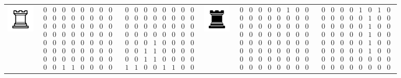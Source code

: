 \begin{table}[]
\begin{tabular}{c c c | c c c}
\includegraphics[scale=0.5]{fig/pieces/R} & 
$\begin{smallmatrix}0&0&0&0&0&0&0&0\\0&0&0&0&0&0&0&0\\0&0&0&0&0&0&0&0\\0&0&0&0&0&0&0&0\\0&0&0&0&0&0&0&0\\0&0&0&0&0&0&0&0\\0&0&0&0&0&0&0&0\\0&0&1&1&0&0&0&0\end{smallmatrix}$ &
$\begin{smallmatrix}0&0&0&0&0&0&0&0\\0&0&0&0&0&0&0&0\\0&0&0&0&0&0&0&0\\0&0&0&0&0&0&0&0\\0&0&0&1&0&0&0&0\\0&0&1&1&0&0&0&0\\0&0&1&1&0&0&0&0\\1&1&0&0&1&1&0&0\end{smallmatrix}$ &

\includegraphics[scale=0.5]{fig/pieces/r} &
$\begin{smallmatrix}0&0&0&0&0&1&0&0\\0&0&0&0&0&0&0&0\\0&0&0&0&0&0&0&0\\0&0&0&0&0&0&0&0\\0&0&0&0&0&0&0&0\\0&0&0&0&0&0&0&0\\0&0&0&0&0&0&0&0\\0&0&0&0&0&0&0&0\end{smallmatrix}$ &
$\begin{smallmatrix}0&0&0&0&1&0&1&0\\0&0&0&0&0&1&0&0\\0&0&0&0&0&1&0&0\\0&0&0&0&0&1&0&0\\0&0&0&0&0&1&0&0\\0&0&0&0&0&1&0&0\\0&0&0&0&0&0&0&0\\0&0&0&0&0&0&0&0\end{smallmatrix}$ \\ [1cm]


\end{tabular}
\end{table}
